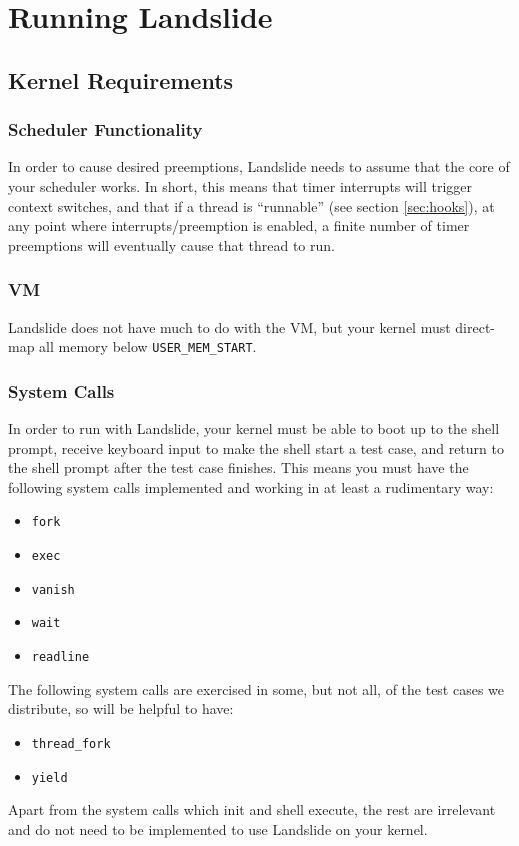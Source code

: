\documentclass{article}
\begin{document}
\section{Running Landslide}

\subsection{Kernel Requirements}

\subsubsection{Scheduler Functionality}
\label{sec:schedfunc}

In order to cause desired preemptions, Landslide needs to assume that the core of your scheduler works. In short, this means that timer interrupts will trigger context switches, and that if a thread is ``runnable'' (see section \ref{sec:hooks}), at any point where interrupts/preemption is enabled, a finite number of timer preemptions will eventually cause that thread to run.

\subsubsection{VM}

Landslide does not have much to do with the VM, but your kernel must direct-map all memory below \texttt{USER\_MEM\_START}.

\subsubsection{System Calls}

In order to run with Landslide, your kernel must be able to boot up to the shell prompt, receive keyboard input to make the shell start a test case, and return to the shell prompt after the test case finishes. This means you must have the following system calls implemented and working in at least a rudimentary way:
\begin{itemize}
	\item \texttt{fork}
	\item \texttt{exec}
	\item \texttt{vanish}
	\item \texttt{wait}
	\item \texttt{readline}
\end{itemize}
The following system calls are exercised in some, but not all, of the test cases we distribute, so will be helpful to have:
\begin{itemize}
	\item \texttt{thread\_fork}
	\item \texttt{yield}
\end{itemize}
Apart from the system calls which init and shell execute, the rest are irrelevant and do not need to be implemented to use Landslide on your kernel.
\end{document}
